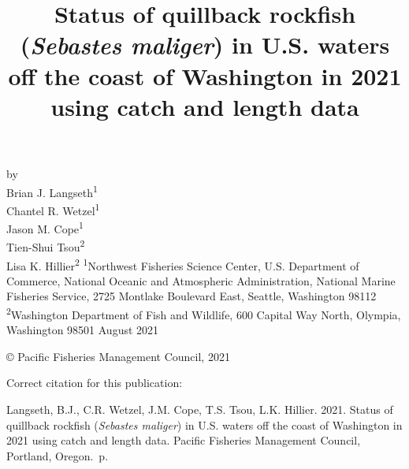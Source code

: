 \documentclass[11pt,
  english,
  a4paper,
]{article}
\date{}
\newcommand{\trTitle}{Status of quillback rockfish (\emph{Sebastes maliger}) in U.S. waters off the coast of Washington in 2021 using catch and length data}
\newcommand{\trYear}{2021}
\newcommand{\trMonth}{August}
\newcommand{\trAuthsBack}{Langseth, B.J., C.R. Wetzel, J.M. Cope, T.S. Tsou, L.K. Hillier}
\newcommand{\trCitation}{
\begin{hangparas}{1em}{1}
\trAuthsBack{}. \trYear{}. \trTitle{}. Pacific Fisheries Management Council, Portland, Oregon. \pageref{LastPage}{}\,p.
\end{hangparas}}
\begin{document}

\renewcommand*{\thefootnote}{\fnsymbol{footnote}}

\small
\thispagestyle{empty}
\noindent
\begin{center}
\title{Status of quillback rockfish (\emph{Sebastes maliger}) in U.S. waters off the coast of Washington in 2021 using catch and length data}
\vspace{1.5cm}
{\Large\textbf{}}
\vfill
by\\
Brian J. Langseth\textsuperscript{1}\\
Chantel R. Wetzel\textsuperscript{1}\\
Jason M. Cope\textsuperscript{1}\\
Tien-Shui Tsou\textsuperscript{2}\\
Lisa K. Hillier\textsuperscript{2}\vfill
\textsuperscript{1}Northwest Fisheries Science Center, U.S. Department of Commerce, National Oceanic and Atmospheric Administration, National Marine Fisheries Service, 2725 Montlake Boulevard East, Seattle, Washington 98112\\
\textsuperscript{2}Washington Department of Fish and Wildlife, 600 Capital Way North, Olympia, Washington 98501\vfill
\trMonth{} \trYear{}
\end{center}
\clearpage

\thispagestyle{empty}
\vspace*{\fill}
\begin{center}
\copyright{} Pacific Fisheries Management Council, \trYear{}\\
\end{center}
\par
\bigskip
\noindent
Correct citation for this publication:
\bigskip
\par
\trCitation{}
\clearpage


\tableofcontents\clearpage
\label{TRlastRoman}
\clearpage

\newpage
\thispagestyle{empty} %
\end{document}
